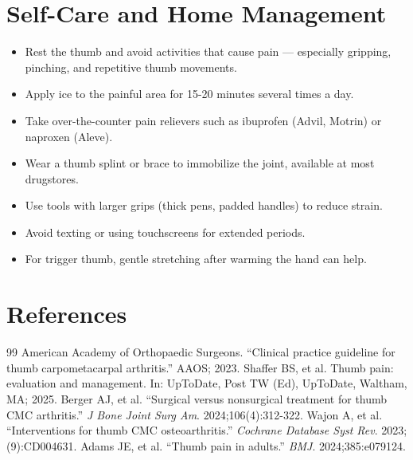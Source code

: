 \section*{Self-Care and Home Management}
\begin{itemize}
  \item Rest the thumb and avoid activities that cause pain — especially gripping, pinching, and repetitive thumb movements.
  \item Apply ice to the painful area for 15-20 minutes several times a day.
  \item Take over-the-counter pain relievers such as ibuprofen (Advil, Motrin) or naproxen (Aleve).
  \item Wear a thumb splint or brace to immobilize the joint, available at most drugstores.
  \item Use tools with larger grips (thick pens, padded handles) to reduce strain.
  \item Avoid texting or using touchscreens for extended periods.
  \item For trigger thumb, gentle stretching after warming the hand can help.
\end{itemize}

\section*{References}
\begin{thebibliography}{99}
 American Academy of Orthopaedic Surgeons. ``Clinical practice guideline for thumb carpometacarpal arthritis.'' AAOS; 2023.
 Shaffer BS, et al. Thumb pain: evaluation and management. In: UpToDate, Post TW (Ed), UpToDate, Waltham, MA; 2025.
 Berger AJ, et al. ``Surgical versus nonsurgical treatment for thumb CMC arthritis.'' \emph{J Bone Joint Surg Am}. 2024;106(4):312-322.
 Wajon A, et al. ``Interventions for thumb CMC osteoarthritis.'' \emph{Cochrane Database Syst Rev}. 2023;(9):CD004631.
 Adams JE, et al. ``Thumb pain in adults.'' \emph{BMJ}. 2024;385:e079124.
\end{thebibliography}
